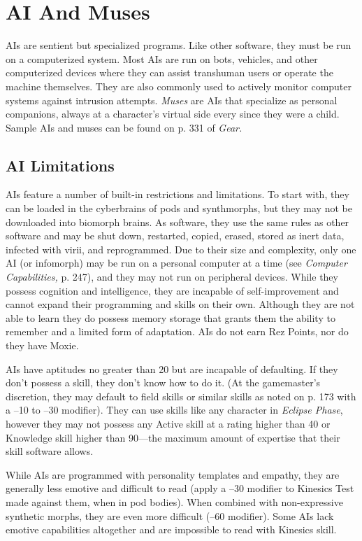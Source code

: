 \section{AI And Muses}

AIs are sentient but specialized programs. Like other 
software, they must be run on a computerized system. 
Most AIs are run on bots, vehicles, and other computerized
devices where they can assist transhuman
users or operate the machine themselves. They are also 
commonly used to actively monitor computer systems 
against intrusion attempts. \textit{Muses} are AIs that specialize
as personal companions, always at a character's
virtual side every since they were a child.
Sample AIs and muses can be found on p. 331 of \textit{Gear.}

\subsection{AI Limitations}

AIs feature a number of built-in restrictions and 
limitations. To start with, they can be loaded in the 
cyberbrains of pods and synthmorphs, but they may 
not be downloaded into biomorph brains. As software, 
they use the same rules as other software and may be 
shut down, restarted, copied, erased, stored as inert 
data, infected with virii, and reprogrammed. Due to 
their size and complexity, only one AI (or infomorph) 
may be run on a personal computer at a time (see 
\textit{Computer Capabilities,} p. 247), and they may not run 
on peripheral devices.
While they possess cognition and intelligence, they 
are incapable of self-improvement and cannot expand 
their programming and skills on their own. Although 
they are not able to learn they do possess memory 
storage that grants them the ability to remember and 
a limited form of adaptation. AIs do not earn Rez 
Points, nor do they have Moxie.

AIs have aptitudes no greater than 20 but are 
incapable of defaulting. If they don't possess a skill, 
they don't know how to do it. (At the gamemaster's 
discretion, they may default to field skills or similar 
skills as noted on p. 173 with a –10 to –30 modifier). 
They can use skills like any character in \textit{Eclipse Phase}, 
however they may not possess any Active skill at a 
rating higher than 40 or Knowledge skill higher than 
90—the maximum amount of expertise that their skill 
software allows.

While AIs are programmed with personality templates
and empathy, they are generally less emotive
and difficult to read (apply a –30 modifier to Kinesics 
Test made against them, when in pod bodies). When 
combined with non-expressive synthetic morphs, they 
are even more difficult (–60 modifier). Some AIs lack 
emotive capabilities altogether and are impossible to 
read with Kinesics skill.


